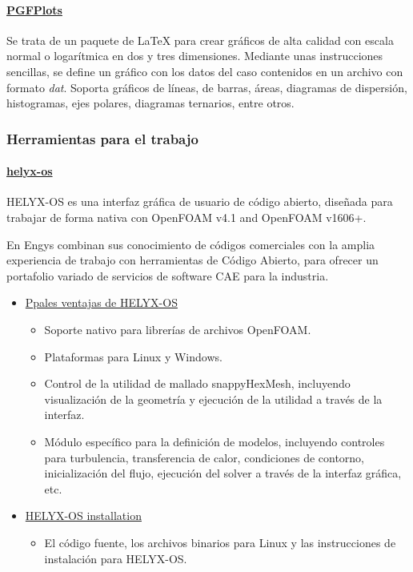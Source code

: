 \paragraph{\texorpdfstring{
\href{http://pgfplots.sourceforge.net/}{PGFPlots}}{PGFPlots}}\label{header-n362}

Se trata de un paquete de LaTeX para crear gráficos de alta calidad con
escala normal o logarítmica en dos y tres dimensiones. Mediante unas
instrucciones sencillas, se define un gráfico con los datos del caso
contenidos en un archivo con formato \emph{dat}. Soporta gráficos de
líneas, de barras, áreas, diagramas de dispersión, histogramas, ejes
polares, diagramas ternarios, entre otros.

\subsubsection{Herramientas para el trabajo}\label{header-n366}

\paragraph{\texorpdfstring{
\href{http://engys.com/es/services/training}{helyx-os}}{helyx-os}}\label{header-n368}

HELYX-OS es una interfaz gráfica de usuario de código abierto, diseñada
para trabajar de forma nativa con OpenFOAM v4.1 and OpenFOAM v1606+.

En Engys combinan sus conocimiento de códigos comerciales con la amplia
experiencia de trabajo con herramientas de Código Abierto, para ofrecer
un portafolio variado de servicios de software CAE para la industria.

\begin{itemize}
\item
  \href{http://engys.com/es/products/helyx-os}{Ppales ventajas de
  HELYX-OS}

  \begin{itemize}
  \item
    Soporte nativo para librerías de archivos OpenFOAM.
  \item
    Plataformas para Linux y Windows.
  \item
    Control de la utilidad de mallado snappyHexMesh, incluyendo
    visualización de la geometría y ejecución de la utilidad a través de
    la interfaz.
  \item
    Módulo específico para la definición de modelos, incluyendo
    controles para turbulencia, transferencia de calor, condiciones de
    contorno, inicialización del flujo, ejecución del solver a través de
    la interfaz gráfica, etc.
  \end{itemize}
\item
  \href{http://engys.github.io/HELYX-OS//installation/}{HELYX-OS
  installation}

  \begin{itemize}
  \item
    El código fuente, los archivos binarios para Linux y las
    instrucciones de instalación para HELYX-OS.
  \end{itemize}
\end{itemize}

